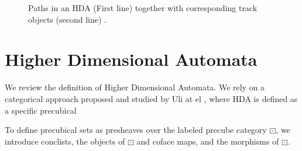 \documentclass[11pt,a4paper,oldfontcommands]{memoir}
\makeatletter
\newcommand\pomsetwop[4]{%
  \vcenter{\xymatrix@1@R=#1@C=#2@M=#3{#4}}%
}
\newcommand\pomset[2][1.3]{%
  \left(%
    \pomsetwop{0ex}{#1em}{2pt}{#2}%
  \right)%
}
\makeatother
\begin{document}
\begin{figure}
  \smallskip
  \caption{Paths in an HDA (First line) together
    with corresponding track objects (second line) \cite{LanguageofHDA}.}
  \label{fi:hda-a|cd-dpaths}
\end{figure}



\section{Higher Dimensional Automata}\label{sec:HDA}
We review the definition of Higher Dimensional Automata. We rely on a categorical approach proposed and studied by Uli at el \cite{LanguageofHDA, KleeneTh}, where HDA is defined as a specific precubical 


To define precubical sets as presheaves over the labeled precube category $\boxdot$, we introduce conclists, the objects of $\boxdot$ and coface maps, and the morphisms of $\boxdot$.
\end{document}
